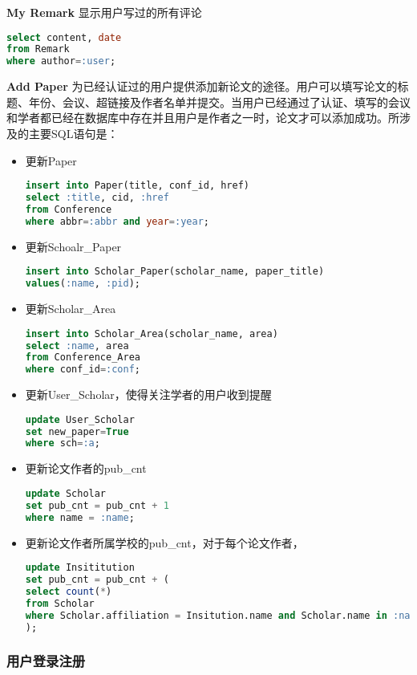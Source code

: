 {\bf My Remark} 显示用户写过的所有评论
\begin{lstlisting}[language=SQL]
select content, date
from Remark
where author=:user;
\end{lstlisting}
{\bf Add Paper} 为已经认证过的用户提供添加新论文的途径。用户可以填写论文的标题、年份、会议、超链接及作者名单并提交。当用户已经通过了认证、填写的会议和学者都已经在数据库中存在并且用户是作者之一时，论文才可以添加成功。所涉及的主要SQL语句是：
\begin{itemize}
\item 更新Paper
\begin{lstlisting}[language=SQL]
insert into Paper(title, conf_id, href)
select :title, cid, :href
from Conference
where abbr=:abbr and year=:year;
\end{lstlisting}
\item 更新Schoalr\_Paper
\begin{lstlisting}[language=SQL]
insert into Scholar_Paper(scholar_name, paper_title)
values(:name, :pid);
\end{lstlisting}
\item 更新Scholar\_Area
\begin{lstlisting}[language=SQL]
insert into Scholar_Area(scholar_name, area)
select :name, area
from Conference_Area
where conf_id=:conf;
\end{lstlisting}
\item 更新User\_Scholar，使得关注学者的用户收到提醒
\begin{lstlisting}[language=SQL]
update User_Scholar
set new_paper=True
where sch=:a;
\end{lstlisting}
\item 更新论文作者的pub\_cnt
\begin{lstlisting}[language=SQL]
update Scholar
set pub_cnt = pub_cnt + 1
where name = :name;
\end{lstlisting}
\item 更新论文作者所属学校的pub\_cnt，对于每个论文作者，
\begin{lstlisting}[language=SQL]
update Insititution
set pub_cnt = pub_cnt + (
select count(*)
from Scholar
where Scholar.affiliation = Insitution.name and Scholar.name in :name_list
);
\end{lstlisting}
\end{itemize}

\subsubsection{用户登录注册}

